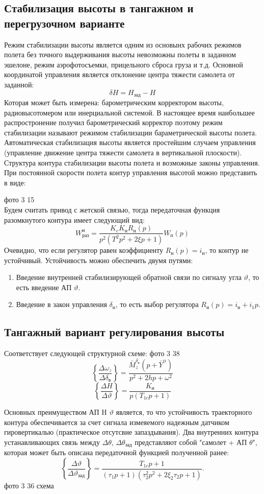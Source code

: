\documentclass{article}
\begin{document}
\subsection{Стабилизация высоты в тангажном и перегрузочном варианте}
Режим стабилизации высоты является одним из основынх рабочих режимов полета без точного выдерживания высоты невозможны полеты в заданном эшелоне, режим аэрофотосъемки, прицельного сброса груза и т.д. Основной координатой управления является отклонение центра тяжести самолета от заданной:
\[
\delta H = H_{зад} - H
\]
Которая может быть измерена: барометрическим корректором высоты, радиовысотомером или инерциальной системой. В настоящее время наибольшее распростронение получил барометрический корректор поэтому режим стабилизации называют режимом стабилизации бараметрической высоты полета. Автоматическая стабилизация высоты является простейшим случаем управления (управление движение центра тяжести самолета в вертикальной плоскости). Структура контура стабилизации высоты полета и возможные законы управления. При постоянной скорости полета контур управления высотой можно представить в виде:

фото 3 15\\
Будем считать привод с жетской связью, тогда передаточная функция разомкнутого контура имеет следующий вид:
\[
W_{раз}^н =\frac{K_c K_н R_н(p)}{p^2(T^2 p^2 + 2 \xi p + 1)}W_п(p)
\]
Очевидно, что если регулятор равен коэффициенту $R_н(p)  = i_н$, то контур не устойчивый.
Устойчивость можно обеспечить двумя путями:

\begin{enumerate}
\item Введение внутренней стабилизирующей обратной связи по сигналу угла $\vartheta$, то есть введение АП $\vartheta$.
\item Введение в закон управления $\delta_н$, то есть выбор регулятора $R_н(p) = i_н + i_1p$.
\end{enumerate}

\subsection{Тангажный вариант регулирования высоты}
Соответствует следующей структурной схеме:
фото 3 38
\[
    \left\{\frac{\Delta \omega_z}{\Delta \delta_в} \right\} = \frac{\bar{M}_z^{\delta_в}(p + \bar{Y}^\alpha)}{p^2 + 2hp + \omega^2} 
\]
\[
    \left\{ \frac{\Delta H}{\Delta \vartheta} \right\} = \frac{K_н}{p(T_{1c}p +1)}
\]

Основных преимуществом АП H $\vartheta$ является, то что устойчивость траекторного контура обеспечивается за счет сигнала измеяемого надежным датчиком гировертикалью (практическое отсутсвие запаздывания). Два внутренних контура устанавливающих связь между $\Delta \theta$, $\Delta \theta_{зад}$ представляют собой "самолет + АП $\theta$", которая может быть описана передаточной функцией полученной ранее:
\[
\left\{\frac{\Delta \vartheta}{\Delta \vartheta_{зад}} \right\} =\frac{T_{1c}p + 1}{(\tau_1 p + 1) (\tau_2^2p^2 + 2 \xi_2 \tau_2 p + 1)}.
\]
фото 3 36 схема 
\end{document}
